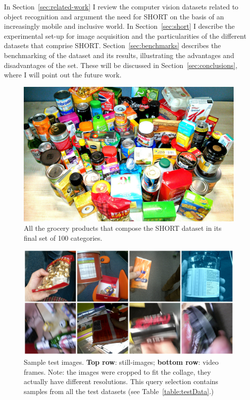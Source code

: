 In Section~\ref{sec:related-work} I review the computer vision datasets related to object recognition and argument the need for SHORT on the basis of an increasingly mobile and inclusive world. In Section~\ref{sec:short} I describe the experimental set-up for image acquisition and the particularities of the different datasets that comprise SHORT. Section~\ref{sec:benchmarks} describes the benchmarking of the dataset and its results, illustrating the advantages and disadvantages of the set. These will be discussed in Section~\ref{sec:conclusions}, where I will point out the future work.

\begin{figure}[h!]
\centering
\includegraphics[width=\textwidth]{./gfx/Chapter03/SHORT_family_photo.jpg}
\caption{All the grocery products that compose the SHORT dataset in its final set of 100 categories.}
\label{fig:short-100-all}
\end{figure}


\begin{figure}
\centering
\includegraphics[width=.75\linewidth]{./gfx/Chapter03/icip-test-imgs2.jpg}
\caption{Sample test images. \textbf{Top row}: still-images; \textbf{bottom row}: video frames. Note: the images were cropped to fit the collage, they actually have different resolutions. This query selection contains samples from all the test datasets (see Table~\ref{table:testData}.)}
\label{fig:short-30test}
\end{figure}

